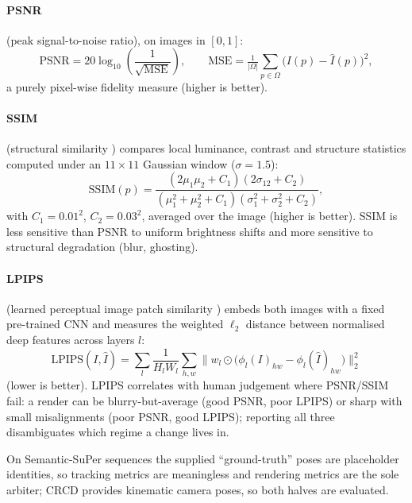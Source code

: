 \documentclass{article}
\begin{document}
\paragraph{PSNR} (peak signal-to-noise ratio), on images in $[0,1]$:
\begin{equation}
\mathrm{PSNR} = 20 \log_{10}\!\left( \frac{1}{\sqrt{\mathrm{MSE}}} \right), \qquad \mathrm{MSE} = \tfrac{1}{|\Omega|}\textstyle\sum_{p \in \Omega} \bigl( I(p) - \hat{I}(p) \bigr)^2 ,
\end{equation}
a purely pixel-wise fidelity measure (higher is better).

\paragraph{SSIM} (structural similarity \cite{Wang2004}) compares local luminance, contrast and structure statistics computed under an $11{\times}11$ Gaussian window ($\sigma{=}1.5$):
\begin{equation}
\mathrm{SSIM}(p) = \frac{(2\mu_1\mu_2 + C_1)(2\sigma_{12} + C_2)} {(\mu_1^2 + \mu_2^2 + C_1)(\sigma_1^2 + \sigma_2^2 + C_2)},
\end{equation}
with $C_1 = 0.01^2$, $C_2 = 0.03^2$, averaged over the image (higher is better). SSIM is less sensitive than PSNR to uniform brightness shifts and more sensitive to structural degradation (blur, ghosting).

\paragraph{LPIPS} (learned perceptual image patch similarity \cite{zhang2018lpips}) embeds both images with a fixed pre-trained CNN and measures the weighted $\ell_2$ distance between normalised deep features across layers $l$:
\begin{equation}
\mathrm{LPIPS}(I, \hat{I}) = \sum_l \frac{1}{H_l W_l} \sum_{h,w} \bigl\lVert w_l \odot \bigl( \phi_l(I)_{hw} - \phi_l(\hat{I})_{hw} \bigr) \bigr\rVert_2^2
\end{equation}
(lower is better). LPIPS correlates with human judgement where PSNR/SSIM fail: a render can be blurry-but-average (good PSNR, poor LPIPS) or sharp with small misalignments (poor PSNR, good LPIPS); reporting all three disambiguates which regime a change lives in.

On Semantic-SuPer sequences the supplied ``ground-truth'' poses are placeholder identities, so tracking metrics are meaningless and rendering metrics are the sole arbiter; CRCD provides kinematic camera poses, so both halves are evaluated.
\end{document}
